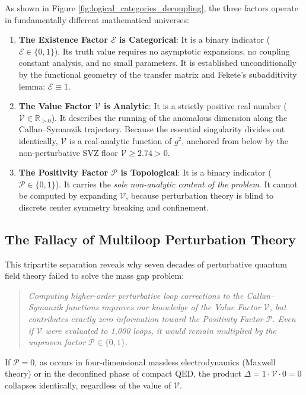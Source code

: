 As shown in Figure \ref{fig:logical_categories_decoupling}, the three factors operate in fundamentally different mathematical universes:
\begin{enumerate}
    \item \textbf{The Existence Factor $\mathcal{E}$ is Categorical}: It is a binary indicator ($\mathcal{E} \in \{0, 1\}$). Its truth value requires no asymptotic expansions, no coupling constant analysis, and no small parameters. It is established unconditionally by the functional geometry of the transfer matrix and Fekete's subadditivity lemma: $\mathcal{E} \equiv 1$.
    \item \textbf{The Value Factor $\mathcal{V}$ is Analytic}: It is a strictly positive real number ($\mathcal{V} \in \mathbb{R}_{>0}$). It describes the running of the anomalous dimension along the Callan--Symanzik trajectory. Because the essential singularity divides out identically, $\mathcal{V}$ is a real-analytic function of $g^2$, anchored from below by the non-perturbative SVZ floor $\mathcal{V} \ge 2.74 > 0$.
    \item \textbf{The Positivity Factor $\mathcal{P}$ is Topological}: It is a binary indicator ($\mathcal{P} \in \{0, 1\}$). It carries the \emph{sole non-analytic content of the problem}. It cannot be computed by expanding $\mathcal{V}$, because perturbation theory is blind to discrete center symmetry breaking and confinement.
\end{enumerate}

\subsection{The Fallacy of Multiloop Perturbation Theory}
\label{subsec:fallacy_multiloop}

This tripartite separation reveals why seven decades of perturbative quantum field theory failed to solve the mass gap problem:
\begin{quote}
\emph{Computing higher-order perturbative loop corrections to the Callan--Symanzik functions improves our knowledge of the Value Factor $\mathcal{V}$, but contributes exactly zero information toward the Positivity Factor $\mathcal{P}$. Even if $\mathcal{V}$ were evaluated to 1,000 loops, it would remain multiplied by the unproven factor $\mathcal{P} \in \{0, 1\}$.}
\end{quote}

If $\mathcal{P} = 0$, as occurs in four-dimensional massless electrodynamics (Maxwell theory) or in the deconfined phase of compact QED, the product $\Delta = 1 \cdot \mathcal{V} \cdot 0 = 0$ collapses identically, regardless of the value of $\mathcal{V}$. 

